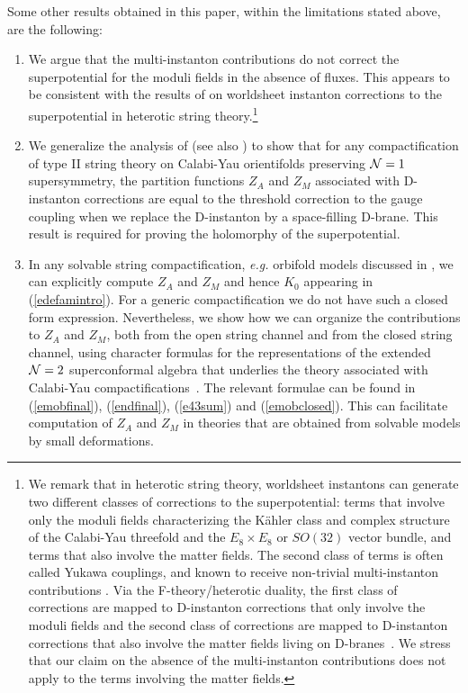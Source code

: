 \documentclass[12pt,a4paper]{article}
\newcommand{\refb}[1]{(\ref{#1})}
\newcommand{\NN}{{\cal N}}
\def\KKZ{K_0}
\begin{document}
Some other results obtained in this paper, within the limitations stated above, are the following:
\begin{enumerate}
\item
We argue that the multi-instanton contributions do not correct the superpotential for the
moduli fields
in the absence of fluxes. This appears to be consistent with the results of \cite{Witten:1999eg}
on worldsheet instanton corrections to the superpotential in heterotic string theory.\footnote{We remark
that in heterotic string theory, worldsheet instantons can generate two different classes of corrections
to the superpotential: terms that involve only the moduli fields characterizing the
K\"ahler class and complex structure
of the Calabi-Yau threefold and the $E_8\times E_8$
or $SO(32)$ vector bundle, and terms that
also involve the matter fields. The second class of terms is often called Yukawa couplings,
and known to receive non-trivial multi-instanton contributions \cite{Candelas:1990rm}.
Via the F-theory/heterotic duality, the first class of corrections are mapped
to D-instanton corrections that only involve the  moduli fields and
the second class of corrections are mapped to D-instanton corrections
that also involve the matter fields living on D-branes~\cite{Witten:1996bn}.
We stress that our claim on the absence of the multi-instanton contributions does
not apply to the terms involving the matter fields.}

\item
We generalize the analysis of \cite{Abel:2006yk,Akerblom:2006hx} (see also \cite{Billo:2007sw})
to show that for any compactification of type II string theory on
Calabi-Yau orientifolds preserving $\NN=1$ supersymmetry, the partition functions $Z_A$ and $Z_M$ associated with
D-instanton corrections are equal to the threshold correction to the gauge coupling when we replace the
D-instanton by a space-filling D-brane. This result is required for proving the holomorphy of the superpotential.

\item
In any solvable string compactification, {\it e.g.} orbifold models discussed in
\cite{Akerblom:2007uc}, we can explicitly
compute $Z_A$ and $Z_M$ and hence $\KKZ$ appearing in \refb{edefamintro}. For a generic compactification
we do not have such a closed form expression. Nevertheless, we show how we can organize the
contributions to $Z_A$ and $Z_M$,
both from the open string channel and from the closed string channel, using character formulas for the
representations of the extended $\NN=2$ superconformal algebra that underlies the theory associated with Calabi-Yau
compactifications~\cite{Eguchi:1988vra,Odake:1988bh,Odake:1989dm,Odake:1989ev}.
The relevant formulae can be found in \refb{emobfinal},
\refb{endfinal}, \refb{e43sum} and \refb{emobclosed}.
This can facilitate computation of $Z_A$ and $Z_M$ in theories that are obtained from solvable
models by small deformations.
\end{enumerate}
\end{document}
